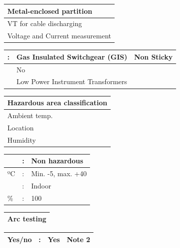 \documentclass[11pt,a4paper]{article}
\begin{document}
\begin{table}[h]
\begin{tabular}{|l|}
\hline
Metal-enclosed partition \\ \hline
VT for cable discharging  \\ \hline
Voltage and Current measurement  \\ \hline
\end{tabular}
\end{table}

\begin{table}[h]
\begin{tabular}{|l|l|l|}
\hline
: & Gas Insulated Switchgear (GIS) & Non Sticky \\ \hline
 & No &  \\ \hline
 & Low Power Instrument Transformers &  \\ \hline
\end{tabular}
\end{table}

\begin{table}[h]
\begin{tabular}{|l|}
\hline
Hazardous area classification \\ \hline
Ambient temp. \\ \hline
Location \\ \hline
Humidity \\ \hline
\end{tabular}
\end{table}

\begin{table}[h]
\begin{tabular}{|l|l|l|}
\hline
 & : & Non hazardous \\ \hline
ºC & : & Min. -5, max. +40 \\ \hline
 & : & Indoor \\ \hline
\% & : & 100 \\ \hline
\end{tabular}
\end{table}

\begin{table}[h]
\begin{tabular}{|l|}
\hline
Arc testing \\ \hline
\end{tabular}
\end{table}

\begin{table}[h]
\begin{tabular}{|l|l|l|l|}
\hline
Yes/no & : & Yes & Note 2 \\ \hline
\end{tabular}
\end{table}
\end{document}
